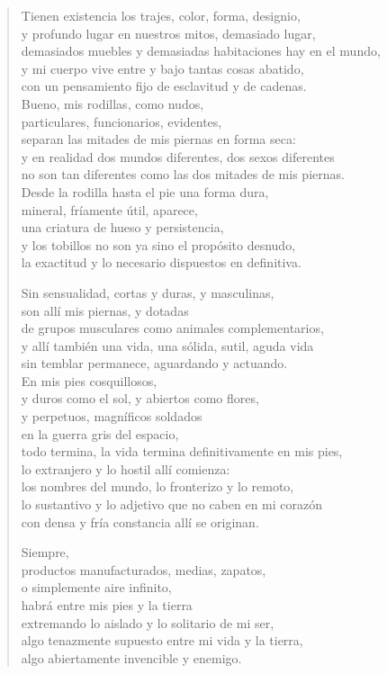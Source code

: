 \documentclass[12pt]{article}
\begin{document}
\begin{verse}
Tienen existencia los trajes, color, forma, designio,\\
y profundo lugar en nuestros mitos, demasiado lugar,\\
demasiados muebles y demasiadas habitaciones hay en el mundo,\\
y mi cuerpo vive entre y bajo tantas cosas abatido,\\
con un pensamiento fijo de esclavitud y de cadenas.\\
Bueno, mis rodillas, como nudos,\\
particulares, funcionarios, evidentes,\\
separan las mitades de mis piernas en forma seca:\\
y en realidad dos mundos diferentes, dos sexos diferentes\\
no son tan diferentes como las dos mitades de mis piernas.\\
Desde la rodilla hasta el pie una forma dura,\\
mineral, fríamente útil, aparece,\\
una criatura de hueso y persistencia,\\
y los tobillos no son ya sino el propósito desnudo,\\
la exactitud y lo necesario dispuestos en definitiva.  

Sin sensualidad, cortas y duras, y masculinas,\\
son allí mis piernas, y dotadas\\
de grupos musculares como animales complementarios,\\
y allí también una vida, una sólida, sutil, aguda vida\\
sin temblar permanece, aguardando y actuando.\\
En mis pies cosquillosos,\\
y duros como el sol, y abiertos como flores,\\
y perpetuos, magníficos soldados\\
en la guerra gris del espacio,\\
todo termina, la vida termina definitivamente en mis pies,\\
lo extranjero y lo hostil allí comienza:\\
los nombres del mundo, lo fronterizo y lo remoto,\\
lo sustantivo y lo adjetivo que no caben en mi corazón\\
con densa y fría constancia allí se originan.  

Siempre,\\
productos manufacturados, medias, zapatos,\\
o simplemente aire infinito,\\
habrá entre mis pies y la tierra\\
extremando lo aislado y lo solitario de mi ser,\\
algo tenazmente supuesto entre mi vida y la tierra,\\
algo abiertamente invencible y enemigo.

\end{verse}
\end{document}
